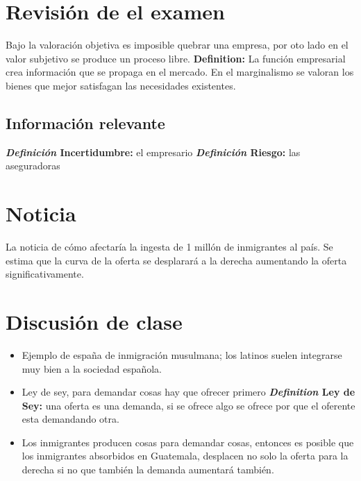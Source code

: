 \section{Revisión de el examen}
Bajo la valoración objetiva es imposible quebrar una empresa, por oto lado en el valor subjetivo se produce un proceso libre.
\newline 
\textbf{Definition: }La función empresarial crea información que se propaga en el mercado.
\newline 
En el marginalismo se valoran los bienes que mejor satisfagan las necesidades existentes.
\newline 

\subsection{Información relevante}
\textbf{\emph{Definición} Incertidumbre:} el empresario
\textbf{\emph{Definición} Riesgo:} las aseguradoras

\section{Noticia}
La noticia de cómo afectaría la ingesta de 1 millón de inmigrantes al país. Se estima que la curva de la oferta se desplarará a la derecha aumentando la oferta significativamente.

\section{Discusión de clase}
\begin{itemize}
    \item Ejemplo de españa de inmigración musulmana; los latinos suelen integrarse muy bien a la sociedad española.
    \item Ley de sey, para demandar cosas hay que ofrecer primero \textbf{\emph{Definition} Ley de Sey:} una oferta es una demanda, si se ofrece algo se ofrece por que el oferente esta demandando otra. 
    \item Los inmigrantes producen cosas para demandar cosas, entonces es posible que los inmigrantes absorbidos en Guatemala, desplacen no solo la oferta para la derecha si no que también la demanda aumentará también.
\end{itemize}


